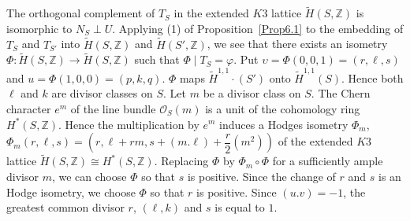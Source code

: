 \begin{pf2}
The orthogonal complement of $T_S$ in the extended $K3$ lattice
$\widetilde{H}(S,\mathbb{Z})$ is isomorphic to $N_S\perp U$. Applying
(1) of Proposition~\ref{Prop6.1} to the embedding of $T_S$ and $T_{S'}$
into $\widetilde{H}(S,\mathbb{Z})$ and $\widetilde{H}(S',\mathbb{Z})$,
we see that there exists an isometry
$\Phi:\widetilde{H}(S,\mathbb{Z})\to \widetilde{H}(S,\mathbb{Z})$ such
that $\Phi\mid T_S=\varphi$. Put $\upsilon =\Phi(0,0,1)=(r,\ell, s)$
and $u=\Phi(1,0,0)=(p,k,q)$. $\Phi$ maps $\widetilde{H}^{1,1}\cdot
(S')$ onto $\widetilde{H}^{1,1}(S)$. Hence both $\ell$ and $k$ are
divisor classes on $S$. Let $m$ be a divisor class on $S$. The Chern
character $e^{m}$ of the line bundle $\mathscr{O}_S(m)$ is a unit of
the cohomology ring $H^{\ast}(S,\mathbb{Z})$. Hence the multiplication
by $e^{m}$ induces a Hodges isometry $\Phi_m$,
$\Phi_m(r,\ell,s)=\left(r,\ell+rm,s+(m.\ell)+\dfrac{r}{2}\left(m^{2}\right)\right)$ of the
extended $K3$ lattice $\widetilde{H}(S,\mathbb{Z})\cong
H^{\ast}(S,\mathbb{Z})$. Replacing $\Phi$ by $\Phi_m\circ \Phi$  for a
sufficiently ample divisor $m$, we can choose $\Phi$ so that $s$ is
positive. Since the change of $r$ and $s$ is an Hodge isometry, we
choose $\Phi$ so that $r$ is positive. Since $(u.v)=-1$, the greatest
common divisor $r$, $(\ell, k)$ and $s$ is equal to $1$. 
\end{pf2}

